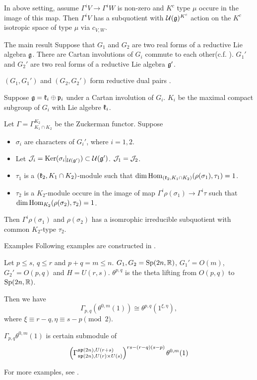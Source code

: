 \documentclass{beamer}
\begin{document}
\begin{frame}
\begin{lemma}\label{lemma:derugkact2}
In above setting, assume $\Gamma^iV \to \Gamma^i W$ is non-zero 
and $K^c$ type $\mu$ occure in the image
of this map.
Then $\Gamma^iV$ has a subquotient with $\cuu(\fgg)^{K^c}$
action on the $K^c$ isotropic space of type $\mu$ via $c_{V,W}$. 
\end{lemma}

\end{frame}

\begin{frame}{The main result}
  Suppose that 
  $G_1$ and $G_2$ are two real forms of a reductive Lie algebra $\fgg$.
  There are Cartan involutions of $G_i$ commute to each other(c.f. \cite{WallachZhu2004}).
  $G_1'$ and $G_2'$ are two real forms of a reductive Lie algebra $\fgg'$.

  $(G_1,G_1')$ and $(G_2,G_2')$ form reductive dual pairs .
  
  Suppose 
  $\fgg=\fkk_i \oplus \fpp_i$ under a Cartan involution of $G_i$.
  $K_i$ be the maximal compact subgroup of $G_i$ with Lie algebre $\fkk_i$.
 
  Let $\Gamma=\Gamma_{K_1\cap K_2}^{K_2}$ be the Zuckerman functor.
  Suppose 
  \begin{itemize}
    \item $\sigma_i$ are characters of $G_i'$, where $i=1,2$. 
  \item  Let $\cjj_i = \Ker(\sigma_i|_{\cuu(\fgg')}) \subset \cuu(\fgg')$.
    $\cjj_1 = \cjj_2$.
  \item $\tau_1$ is a $(\fkk_2,K_1\cap K_2)$-module such that
    $\dim \Hom_{(\fkk_2,K_1\cap K_2)}(\rho(\sigma_1),\tau_1) = 1$.
  \item $\tau_2$ is a $K_2$-module occure in the
    image of map $\Gamma^i \rho(\sigma_1) \to \Gamma^i \tau$ 
    such that 
    $\dim \Hom_{K_2}(\rho(\sigma_2),\tau_2) =1$.
  \end{itemize}
  Then $\Gamma^i \rho(\sigma_1)$ and 
  $\rho(\sigma_2)$ has a isomrophic irreducible subquotient 
  with common $K_2$-type $\tau_2$.

\end{frame}

\begin{frame}{Examples}
Following examples are constructed in \cite{WallachZhu2004}.

Let $p\leq s$, $q\leq r$ and
$p+q=m\leq n$. 
$G_1,G_2 = \Sp(2n,\bR)$, $G_1' = O(m)$, $G_2'=O(p,q)$ and
$H = U(r,s)$.
$\theta^{p,q}$ is the theta lifting from $O(p,q)$ to $\Sp(2n,\bR)$.

Then we have
\[
\Gamma_{p,q}(\theta^{0,m}(1)) \cong \theta^{p,q}(1^{\xi,\eta}),
\]
where $\xi \equiv r-q, \eta\equiv s-p \pmod{2}$.


$\Gamma_{p,q}\theta^{0,m}(1)$ is certain submodule of 
\[
\left(\Gamma_{\sp(2n),U(r)\times U(s)}^{\sp(2n), U(r+s)}\right)^{rs-(r-q)(s-p)}\theta^{0,m}(1)
\]
 

For more examples, see \cite{Enright1985}.
\end{frame}

{}

\end{document}
